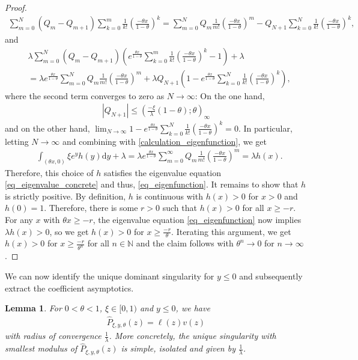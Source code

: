 \documentclass[12pt]{article}
\newcommand{\N}{\mathbb{N}} %
\newcommand{\1}{\mathds{1}}
\renewcommand{\d}{\mathrm{d}}
\theoremstyle{definition}
\theoremstyle{plain}
\newtheorem{Lemma}[definition]{Lemma}
\theoremstyle{remark}
\begin{document}
\begin{proof}
\begin{align*}
    \sum_{m=0}^N \left(Q_{m}-Q_{m+1}\right)\sum_{k=0}^m\frac{1}{k!}\left(\frac{-\theta x}{1-\theta}\right)^k
    =\sum_{m=0}^NQ_m\frac{1}{m!}\left(\frac{-\theta x}{1-\theta}\right)^m-Q_{N+1}\sum_{k=0}^{N}\frac{1}{k!}\left(\frac{-\theta x}{1-\theta}\right)^k,
\end{align*}
and
\begin{align*}
    &\lambda\sum_{m=0}^N \left(Q_{m}-Q_{m+1}\right)\left(e^{\frac{\theta x}{1-\theta}}\sum_{k=0}^m\frac{1}{k!}\left(\frac{-\theta x}{1-\theta}\right)^k-1\right)+\lambda
   \\&=\lambda e^{\frac{\theta x}{1-\theta}}\sum_{m=0}^NQ_m\frac{1}{m!}\left(\frac{-\theta x}{1-\theta}\right)^m+\lambda Q_{N+1}\left(1-e^{\frac{\theta x}{1-\theta}}\sum_{k=0}^{N}\frac{1}{k!}\left(\frac{-\theta x}{1-\theta}\right)^k\right),
\end{align*}
where the second term converges to zero as $N\to\infty$: On the one hand, 
\begin{align*}
    |Q_{N+1}|\le \left(\frac{-\xi}{\lambda}(1-\theta);\theta\right)_\infty
\end{align*}
and on the other hand, $\lim_{N\to\infty} 1-e^{\frac{\theta x}{1-\theta}}\sum_{k=0}^{N}\frac{1}{k!}\left(\frac{-\theta x}{1-\theta}\right)^k=0$. In particular, letting $N\to\infty$ and combining with \eqref{calculation_eigenfunction}, we get
\begin{align*}
    &\int_{(\theta x,0)}\xi  e^yh(y)\d y+\lambda
    =\lambda e^{\frac{\theta x}{1-\theta}}\sum_{m=0}^\infty Q_m\frac{1}{m!}\left(\frac{-\theta x}{1-\theta}\right)^m
    =\lambda h(x).
\end{align*}
Therefore, this choice of $h$ satisfies the eigenvalue equation \eqref{eq_eigenvalue_concrete} and thus, \eqref{eq_eigenfunction}. It remains to show that $h$ is strictly positive. By definition, $h$ is continuous with $h(x)>0$ for $x>0$ and $h(0)=1$. Therefore, there is some $r>0$ such that $h(x)>0$ for all $x\ge-r$. For any $x$ with $\theta x\ge -r$, the eigenvalue equation \eqref{eq_eigenfunction} now implies $\lambda h(x)>0$, so we get $h(x)>0$ for $x\ge\frac{-r}{\theta}$. Iterating this argument, we get $h(x)>0$ for $x\ge\frac{-r}{\theta^n}$ for all $n\in\N$ and the claim follows with $\theta^n\to0$ for $n\to\infty$.
\end{proof}
We can now identify the unique dominant singularity for $y\leq 0$ and subsequently extract the coefficient asymptotics.
\begin{Lemma}\label{gf_pos_theta_le1}
  For $0<\theta<1$, $\xi\in[0,1)$ and $y\le 0$, we have
    \begin{align*}
      \hat{P}_{\xi,y,\theta}(z)= \ell(z)v(z)
    \end{align*}
    with radius of convergence $\frac{1}{\lambda}$. More concretely, the unique singularity with smallest modulus of $\hat{P}_{\xi,y,\theta}(z)$ is simple, isolated and given by $\frac{1}{\lambda}$.
\end{Lemma}
\end{document}
